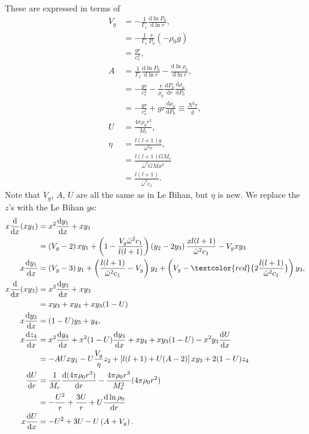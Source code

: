 \documentclass[11pt,
        usenames, %
        twocolumn,
        landscape,
        dvipsnames %
    ]{article}
\newcommand*{\rd}[2]{\frac{\mathrm{d}#1}{\mathrm{d}#2}}
\newcommand*{\p}[1]{\left(#1\right)}
\newcommand*{\s}[1]{\left[#1\right]}
\begin{document}
These are expressed in terms of
\begin{align}
    V_g &= -\frac{1}{\Gamma_1}\rd{\ln P_0}{\ln r},\\
        &= -\frac{1}{\Gamma_1}\frac{r}{P_0}\p{-\rho_0 g}\nonumber\\
        &= \frac{gr}{c_s^2},\\
    A &= \frac{1}{\Gamma_1}\rd{\ln P_0}{\ln r}
        - \rd{\ln \rho_0}{\ln r},\\
        &= -\frac{gr}{c_s^2} - \frac{r}{\rho_0}\rd{P_0}{r}\rd{\rho_0}{P_0}
            \nonumber\\
        &= -\frac{gr}{c_s^2} + gr\rd{\rho_0}{P_0} \equiv \frac{N^2r}{g},\\
    U &= \frac{4\pi \rho_0 r^3}{M_r},\\
    \eta &= \frac{l(l + 1)g}{\omega^2 r},\\
        &= \frac{l(l + 1) GM_r}{\bar{\omega}^2GMx^3}\nonumber\\
        &= \frac{l(l+1)}{\bar{\omega}^2c_1}.
\end{align}
Note that $V_g$, $A$, $U$ are all the same as in Le Bihan, but $\eta$ is new. We
replace the $z$'s with the Le Bihan $y$s:
\begin{align}
    x\rd{}{x}(xy_1)
        &= x^2\rd{y_1}{x} + xy_1\nonumber\\
        &= \p{V_g - 2}xy_1
            + \p{1 - \frac{V_g \bar{\omega}^2c_1}{l(l+1)}}\p{y_2 - 2y_3}
                \frac{xl(l+1)}{\bar{\omega}^2c_1}
            - V_gxy_3\nonumber\\
    x\rd{y_1}{x} &= \p{V_g - 3}y_1
        + \p{\frac{l(l+1)}{\bar{\omega}^2c_1} - V_g}y_2
        + \p{V_g - \textcolor{red}{2\frac{l(l+1)}{\bar{\omega}^2c_1}}}y_3,\\
    x\rd{}{x}(xy_3) &= x^2\rd{y_3}{x} + xy_3\nonumber\\
        &= xy_3 + xy_4 + xy_3(1 - U)\nonumber\\
    x\rd{y_3}{x} &= (1 - U)y_3 + y_4,\\
    x\rd{z_4}{x} &= x^2\rd{y_4}{x} + x^2(1 - U)\rd{y_3}{x}
            + xy_4 + xy_3(1 - U) - x^2y_3\rd{U}{x}\nonumber\\
        &= -AU xy_1 - U\frac{V_g}{\eta}z_2
            + \s{l(l+1) + U(A - 2)}xy_3
            + 2(1 - U)z_4\nonumber\\
    \rd{U}{r} &= \frac{1}{M_r}\rd{(4\pi \rho_0r^3)}{r}
            - \frac{4\pi \rho_0r^3}{M_r^2}(4\pi \rho_0r^2)\nonumber\\
        &= -\frac{U^2}{r} + \frac{3U}{r} + U\rd{\ln \rho_0}{r}\nonumber\\
    x\rd{U}{x} &= -U^2 + 3U - U\p{A + V_g}.
\end{align}
\end{document}

